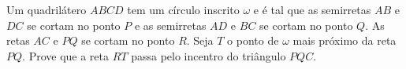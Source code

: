 Um quadrilátero $ABCD$ tem um círculo inscrito $\omega$ e é tal que as semirretas $AB$ e $DC$ se cortam no ponto $P$ e as semirretas $AD$ e $BC$ se cortam no ponto $Q$. As retas $AC$ e $PQ$ se cortam no ponto $R$. Seja $T$ o ponto de $\omega$ mais próximo da reta $PQ$. Prove que a reta $RT$ passa pelo incentro do triângulo $PQC$.